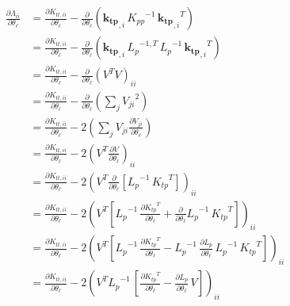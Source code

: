 \documentclass[11pt,a4paper]{article}
\numberwithin{equation}{section}
\begin{document}
\begin{align}
\frac{\partial \Lambda_{ii}}{\partial \theta_\ell}
  &= \frac{\partial K_{tt,ii}}{\partial \theta_\ell} - \frac{\partial}{\partial \theta_\ell}\left(\mathbf{k_{tp}}_{,i}\,{K_{pp}}^{-1}\,{\mathbf{k_{tp}}_{,i}}^T\right) \\
  &= \frac{\partial K_{tt,ii}}{\partial \theta_\ell} - \frac{\partial}{\partial \theta_\ell}\left(\mathbf{k_{tp}}_{,i}\,{L_{p}}^{-1,T}\,{L_p}^{-1}\,{\mathbf{k_{tp}}_{,i}}^T\right) \\
  &= \frac{\partial K_{tt,ii}}{\partial \theta_\ell} - \frac{\partial}{\partial \theta_\ell}\left(V^T V\right)_{ii} \\
  &= \frac{\partial K_{tt,ii}}{\partial \theta_\ell} - \frac{\partial}{\partial \theta_\ell}\left(\sum_j {V_{ji}}^2\right) \\
  &= \frac{\partial K_{tt,ii}}{\partial \theta_\ell} - 2\left(\sum_j V_{ji} \frac{\partial V_{ji}}{\partial \theta_\ell}\right) \\
  &= \frac{\partial K_{tt,ii}}{\partial \theta_\ell} - 2\left(V^T \frac{\partial V}{\partial \theta_\ell}\right)_{ii} \\
  &= \frac{\partial K_{tt,ii}}{\partial \theta_\ell} - 2\left(V^T \frac{\partial }{\partial \theta_\ell}[{L_p}^{-1}\,{K_{tp}}^{T}]\right)_{ii} \\
  &= \frac{\partial K_{tt,ii}}{\partial \theta_\ell} - 2\left(V^T \left[{L_p}^{-1}\,\frac{\partial {K_{tp}}^{T}}{\partial \theta_\ell} + \frac{\partial }{\partial \theta_\ell}{L_p}^{-1}\,{K_{tp}}^{T}\right]\right)_{ii} \\
  &= \frac{\partial K_{tt,ii}}{\partial \theta_\ell} - 2\left(V^T \left[{L_p}^{-1}\,\frac{\partial {K_{tp}}^{T}}{\partial \theta_\ell} - {L_p}^{-1}\,\frac{\partial L_p}{\partial \theta_\ell}\,{L_p}^{-1}\,{K_{tp}}^{T}\right]\right)_{ii} \\
  &= \frac{\partial K_{tt,ii}}{\partial \theta_\ell} - 2\left(V^T {L_p}^{-1}\,\left[\frac{\partial {K_{tp}}^{T}}{\partial \theta_\ell} - \frac{\partial L_p}{\partial \theta_\ell}\,V\right]\right)_{ii} \\
\end{align}
\end{document}

